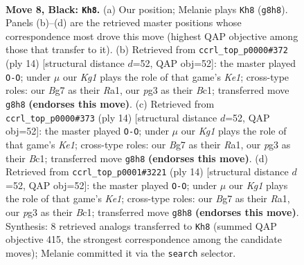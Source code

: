 \documentclass[11pt]{article}
\begin{document}
\begin{figure}[p]\centering
\begin{subfigure}{0.46\textwidth}\centering
\resizebox{\linewidth}{!}{%
\newchessgame
\chessboard[
  setfen={r1bq1rk1/pp1pppbp/5np1/2p5/2Pn4/2N2NP1/PP1PPPBP/R1BQ1RK1 b - - 7 8},
  showmover=false,
  pgfstyle=straightmove, color=movearrow, markmove={g8-h8}
]}
\caption{}
\end{subfigure}\hfill
\begin{subfigure}{0.46\textwidth}\centering
\resizebox{\linewidth}{!}{%
\newchessgame
\chessboard[
  setfen={r1bq1rk1/pp1pppbp/2n2np1/8/2PN4/2N3P1/PP2PPBP/R1BQK2R w KQ - 5 8},
  showmover=false,
  pgfstyle=straightmove, color=movearrow, markmove={e1-g1}
]}
\caption{}
\end{subfigure}
\\[4pt]
\begin{subfigure}{0.46\textwidth}\centering
\resizebox{\linewidth}{!}{%
\newchessgame
\chessboard[
  setfen={r1bq1rk1/pp1pppbp/2n2np1/8/2PN4/2N3P1/PP2PPBP/R1BQK2R w KQ - 5 8},
  showmover=false,
  pgfstyle=straightmove, color=movearrow, markmove={e1-g1}
]}
\caption{}
\end{subfigure}\hfill
\begin{subfigure}{0.46\textwidth}\centering
\resizebox{\linewidth}{!}{%
\newchessgame
\chessboard[
  setfen={r1bq1rk1/pp1pppbp/2n2np1/8/2PN4/2N3P1/PP2PPBP/R1BQK2R w KQ - 3 8},
  showmover=false,
  pgfstyle=straightmove, color=movearrow, markmove={e1-g1}
]}
\caption{}
\end{subfigure}
\caption{\textbf{Move 8, Black: \texttt{Kh8}.} (a) Our position; Melanie plays \texttt{Kh8} (\texttt{g8h8}). Panels (b)--(d) are the retrieved master positions whose correspondence most drove this move (highest QAP objective among those that transfer to it). (b) Retrieved from \texttt{ccrl\_top\_p0000\#372} (ply 14) [structural distance $d$=52, QAP obj=52]: the master played \texttt{O-O}; under $\mu$ our \emph{Kg1} plays the role of that game's \emph{Ke1}; cross-type roles: our \emph{B}g7 as their \emph{R}a1, our \emph{p}g3 as their \emph{B}c1; transferred move \texttt{g8h8} \textbf{(endorses this move)}. (c) Retrieved from \texttt{ccrl\_top\_p0000\#373} (ply 14) [structural distance $d$=52, QAP obj=52]: the master played \texttt{O-O}; under $\mu$ our \emph{Kg1} plays the role of that game's \emph{Ke1}; cross-type roles: our \emph{B}g7 as their \emph{R}a1, our \emph{p}g3 as their \emph{B}c1; transferred move \texttt{g8h8} \textbf{(endorses this move)}. (d) Retrieved from \texttt{ccrl\_top\_p0001\#3221} (ply 14) [structural distance $d$=52, QAP obj=52]: the master played \texttt{O-O}; under $\mu$ our \emph{Kg1} plays the role of that game's \emph{Ke1}; cross-type roles: our \emph{B}g7 as their \emph{R}a1, our \emph{p}g3 as their \emph{B}c1; transferred move \texttt{g8h8} \textbf{(endorses this move)}. Synthesis: 8 retrieved analogs transferred to \texttt{Kh8} (summed QAP objective 415, the strongest correspondence among the candidate moves); Melanie committed it via the \texttt{search} selector.}
\label{fig:thought-m15}
\end{figure}
\end{document}
